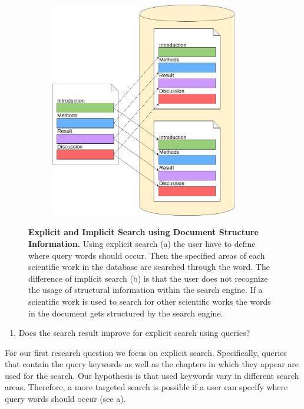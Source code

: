 \begin{figure}[t]
\begin{subfigure}[c]{0.49\textwidth}
    \includegraphics[width=0.9\textwidth]{figures/implicit}
  \end{subfigure}
  \caption[Explicit and Implicit Search using Document Structure Information]{\textbf{Explicit and Implicit Search using Document Structure Information.} Using explicit search (a) the user have to define where query words should occur. Then the specified areas of each scientific work in the database are searched through the word. The difference of implicit search (b) is that the user does not recognize the usage of structural information within the search engine. If a scientific work is used to search for other scientific works the words in the document gets structured by the search engine.}
  \label{fig:implicit_vs_explicit}
\end{figure}

\begin{enumerate}
  \item Does the search result improve for explicit search using queries?
\end{enumerate}

For our first research question we focus on explicit search. Specifically, queries that contain the query keywords as well as the chapters in which they appear are used for the search. Our hypothesis is that used keywords vary in different search areas. Therefore, a more targeted search is possible if a user can specify where query words should occur (see  a).

